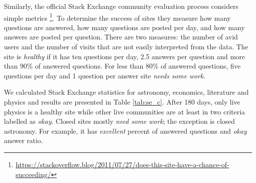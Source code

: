 Similarly, the official Stack Exchange community evaluation process considers simple metrics \footnote{\href{https://stackoverflow.blog/2011/07/27/does-this-site-have-a-chance-of-succeeding/}{https://stackoverflow.blog/2011/07/27/does-this-site-have-a-chance-of-succeeding/}}. To determine the success of sites they measure how many questions are answered, how many questions are posted per day, and how many answers are posted per question. There are two measures: the number of avid users and the number of visits that are not easily interpreted from the data. The site is \textit{healthy} if it has ten questions per day, 2.5 answers per question and more than $90\%$ of answered questions. For less than $80\%$ of answered questions, five questions per day and 1 question per answer site \textit{needs some work}. 

We calculated Stack Exchange statistics for astronomy, economics, literature and physics and results are presented in Table \ref{tab:se_c}. After 180 days, only live physics is a healthy site while other live communities are at least in two criteria labelled as \textit{okay}. Closed sites mostly \textit{need some work}; the exception is closed astronomy. For example, it has \textit{excellent} percent of answered questions and \textit{okay} answer ratio.  


